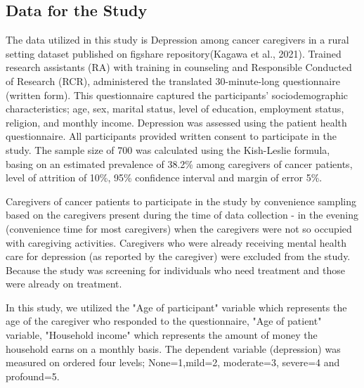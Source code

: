 \documentclass[12pt]{article}
\numberwithin{equation}{section}
\begin{document}
\subsection{Data for the Study}
The data utilized in this study is Depression among cancer caregivers in a rural setting dataset published on figshare repository(Kagawa et al., 2021). Trained research assistants (RA) with training in counseling and Responsible Conducted of Research (RCR), administered the translated 30-minute-long questionnaire (written form). This questionnaire captured the participants' sociodemographic characteristics; age, sex, marital status, level of education, employment status, religion, and monthly income. Depression was assessed using the patient health questionnaire. All participants provided written consent to participate in the study. The sample size of 700 was calculated using the Kish-Leslie formula, basing on an estimated prevalence of 38.2\% among caregivers of cancer patients, level of attrition of 10\%, 95\% confidence interval and margin of error 5\%.

\noindent Caregivers of cancer patients to participate in the study by convenience sampling based on the caregivers present during the time of data collection - in the evening (convenience time for most caregivers) when the caregivers were not so occupied with caregiving activities. Caregivers who were already receiving mental health care for depression (as reported by the caregiver) were excluded from the study. Because the study was screening for individuals who need treatment and those were already on treatment.

\noindent In this study, we utilized the "Age of participant" variable which represents the age of the caregiver who responded to the questionnaire, "Age of patient" variable, "Household income" which represents the amount of money the household earns on a monthly basis.
The dependent variable (depression) was measured on ordered four levels; None=1,mild=2, moderate=3, severe=4 and profound=5.
\end{document}
